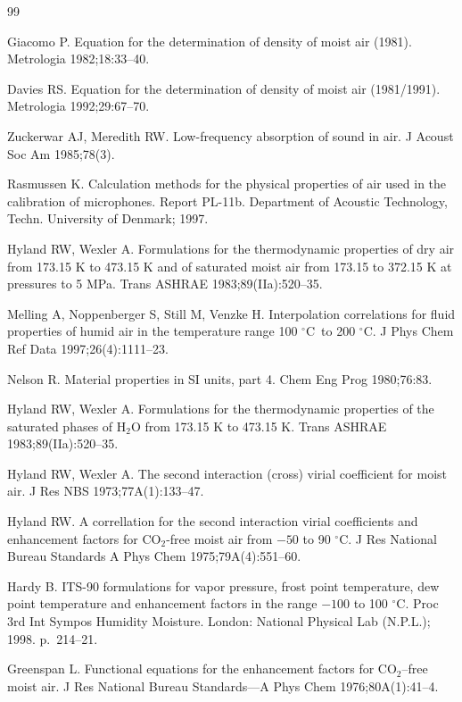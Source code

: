 \documentclass[11pt]{article}
\newcommand{\degC}{$^{\circ}$C}
\begin{document}
\begin{thebibliography}{99}
\small

 Giacomo P. Equation for the determination of density of
moist air (1981). Metrologia 1982;18:33--40.

 Davies RS. Equation for the determination of density of
moist air (1981/1991). Metrologia 1992;29:67--70.

 Zuckerwar AJ, Meredith RW. Low-frequency absorption of
sound in air. J Acoust Soc Am 1985;78(3).

 Rasmussen K. Calculation methods for the physical
properties of air used in the calibration of microphones. Report
PL-11b. Department of Acoustic Technology, Techn. University of
Denmark; 1997.

 Hyland RW, Wexler A. Formulations for the thermodynamic
properties of dry air from 173.15 K to 473.15 K and of saturated moist
air from 173.15 to 372.15 K at pressures to 5 MPa. Trans ASHRAE
1983;89(IIa):520--35.

 Melling A, Noppenberger S, Still M, Venzke H.
Interpolation correlations for fluid properties of humid air in the
temperature range 100 \degC\ to 200 \degC. J Phys Chem Ref Data
1997;26(4):1111--23.

 Nelson R. Material properties in SI units, part 4. Chem
Eng Prog 1980;76:83.

 Hyland RW, Wexler A. Formulations for the thermodynamic
properties of the saturated phases of H$_2$O from 173.15 K to
473.15 K. Trans ASHRAE 1983;89(IIa):520--35.

 Hyland RW, Wexler A. The second interaction (cross) virial
coefficient for moist air. J Res NBS 1973;77A(1):133--47.

 Hyland RW. A correllation for the second interaction
virial coefficients and enhancement factors for CO$_2$-free moist air
from $-50$ to 90 \degC. J Res National Bureau Standards A Phys Chem
1975;79A(4):551--60.

 Hardy B. ITS-90 formulations for vapor pressure, frost
point temperature, dew point temperature and enhancement factors in
the range $-100$ to 100 \degC. Proc 3rd Int Sympos Humidity Moisture.
London: National Physical Lab (N.P.L.); 1998. p.\ 214--21.

 Greenspan L. Functional equations for the enhancement
factors for CO$_2$--free moist air. J Res National Bureau
Standards---A Phys Chem 1976;80A(1):41--4.


\end{thebibliography}
\end{document}
